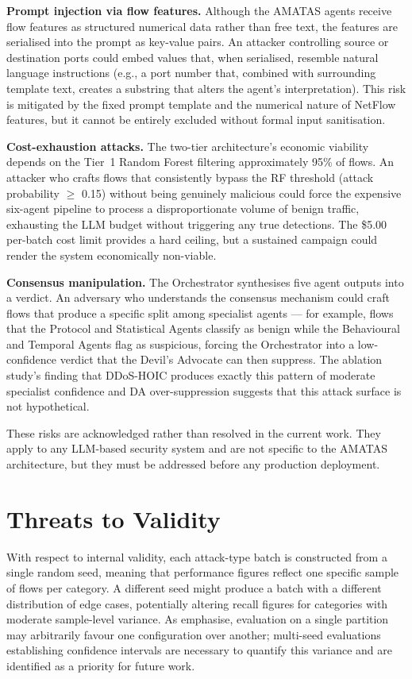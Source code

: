 \documentclass[../main.tex]{subfiles}
\begin{document}
\textbf{Prompt injection via flow features.} Although the AMATAS agents receive flow features as structured numerical data rather than free text, the features are serialised into the prompt as key-value pairs. An attacker controlling source or destination ports could embed values that, when serialised, resemble natural language instructions (e.g., a port number that, combined with surrounding template text, creates a substring that alters the agent's interpretation). This risk is mitigated by the fixed prompt template and the numerical nature of NetFlow features, but it cannot be entirely excluded without formal input sanitisation.

\textbf{Cost-exhaustion attacks.} The two-tier architecture's economic viability depends on the Tier~1 Random Forest filtering approximately 95\% of flows. An attacker who crafts flows that consistently bypass the RF threshold (attack probability $\geq$ 0.15) without being genuinely malicious could force the expensive six-agent pipeline to process a disproportionate volume of benign traffic, exhausting the LLM budget without triggering any true detections. The \$5.00 per-batch cost limit provides a hard ceiling, but a sustained campaign could render the system economically non-viable.

\textbf{Consensus manipulation.} The Orchestrator synthesises five agent outputs into a verdict. An adversary who understands the consensus mechanism could craft flows that produce a specific split among specialist agents --- for example, flows that the Protocol and Statistical Agents classify as benign while the Behavioural and Temporal Agents flag as suspicious, forcing the Orchestrator into a low-confidence verdict that the Devil's Advocate can then suppress. The ablation study's finding that DDoS-HOIC produces exactly this pattern of moderate specialist confidence and DA over-suppression suggests that this attack surface is not hypothetical.

These risks are acknowledged rather than resolved in the current work. They apply to any LLM-based security system and are not specific to the AMATAS architecture, but they must be addressed before any production deployment.

\section{Threats to Validity}
\label{sec:threats-to-validity}

With respect to internal validity, each attack-type batch is constructed from a single random seed, meaning that performance figures reflect one specific sample of flows per category. A different seed might produce a batch with a different distribution of edge cases, potentially altering recall figures for categories with moderate sample-level variance. As \textcite{Cawley2010} emphasise, evaluation on a single partition may arbitrarily favour one configuration over another; multi-seed evaluations establishing confidence intervals are necessary to quantify this variance and are identified as a priority for future work.
\end{document}
